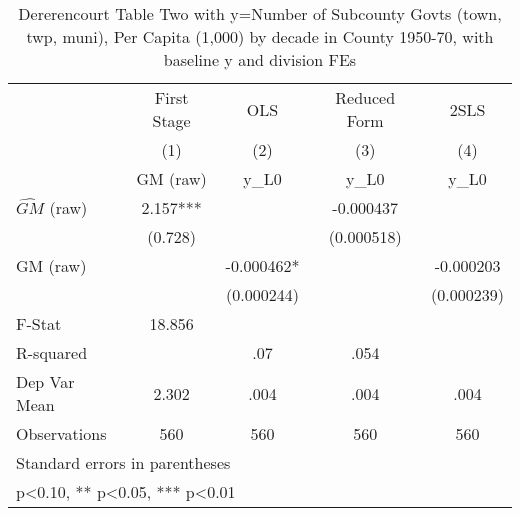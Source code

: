 \begin{table}[htbp]\centering
\def\sym#1{\ifmmode^{#1}\else\(^{#1}\)\fi}
\caption{Dererencourt Table Two with y=Number of Subcounty Govts (town, twp, muni), Per Capita (1,000) by decade in County 1950-70, with baseline y and division FEs}
\begin{tabular}{l*{4}{c}}
\toprule
                    & First Stage   &         OLS   &Reduced Form   &        2SLS   \\
                    &\multicolumn{1}{c}{(1)}&\multicolumn{1}{c}{(2)}&\multicolumn{1}{c}{(3)}&\multicolumn{1}{c}{(4)}\\
                    &\multicolumn{1}{c}{GM  (raw)}&\multicolumn{1}{c}{y\_L0}&\multicolumn{1}{c}{y\_L0}&\multicolumn{1}{c}{y\_L0}\\
\midrule
$\hat{GM}$ (raw)    &       2.157***&               &   -0.000437   &               \\
                    &     (0.728)   &               &  (0.000518)   &               \\
\addlinespace
GM  (raw)           &               &   -0.000462*  &               &   -0.000203   \\
                    &               &  (0.000244)   &               &  (0.000239)   \\
\midrule
F-Stat              &      18.856   &               &               &               \\
R-squared           &               &         .07   &        .054   &               \\
Dep Var Mean        &       2.302   &        .004   &        .004   &        .004   \\
Observations        &         560   &         560   &         560   &         560   \\
\bottomrule
\multicolumn{5}{l}{\footnotesize Standard errors in parentheses}\\
\multicolumn{5}{l}{\footnotesize * p<0.10, ** p<0.05, *** p<0.01}\\
\end{tabular}
\end{table}
